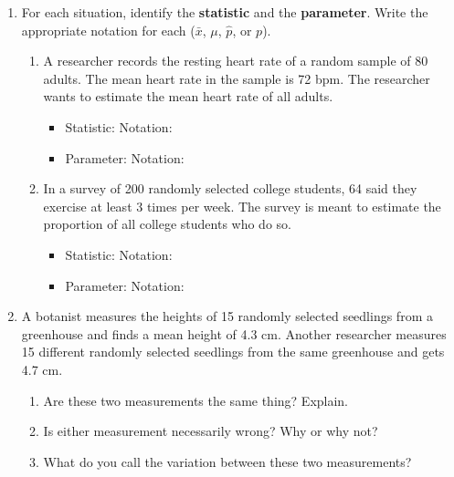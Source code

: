 \documentclass[10pt]{article}
\begin{document}
\namedateperiod

\vspace{0.15in}

\begin{enumerate}

  \item For each situation, identify the \textbf{statistic} and the \textbf{parameter}.
        Write the appropriate notation for each ($\bar{x}$, $\mu$, $\hat{p}$, or $p$).

        \begin{enumerate}[label=\alph*.]
          \item A researcher records the resting heart rate of a random sample of 80
                adults. The mean heart rate in the sample is 72 bpm. The researcher
                wants to estimate the mean heart rate of all adults.
                \begin{itemize}
                  \item Statistic: \blank{5cm} \quad Notation: \blank{1.8cm}
                  \item Parameter: \blank{5cm} \quad Notation: \blank{1.8cm}
                \end{itemize}
          \item In a survey of 200 randomly selected college students, 64 said they
                exercise at least 3 times per week. The survey is meant to estimate the
                proportion of all college students who do so.
                \begin{itemize}
                  \item Statistic: \blank{5cm} \quad Notation: \blank{1.8cm}
                  \item Parameter: \blank{5cm} \quad Notation: \blank{1.8cm}
                \end{itemize}
        \end{enumerate}

  \item A botanist measures the heights of 15 randomly selected seedlings from a
        greenhouse and finds a mean height of 4.3 cm. Another researcher measures 15
        different randomly selected seedlings from the same greenhouse and gets 4.7 cm.

        \begin{enumerate}[label=\alph*.]
          \item Are these two measurements the same thing? Explain. 
          \item Is either measurement necessarily wrong? Why or why not? 
          \item What do you call the variation between these two measurements?
                \blank{5cm}
        \end{enumerate}


\end{enumerate}
\end{document}
